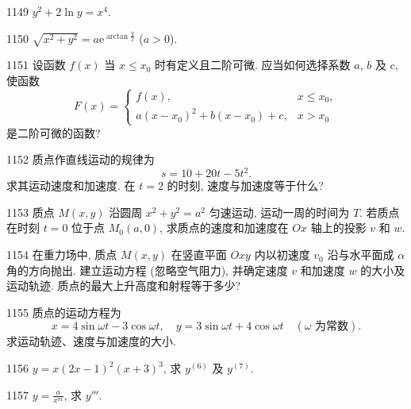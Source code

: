 \begin{prob}[S]{1149}
$y^2 + 2\ln y = x^4$.
\end{prob}

\begin{prob}[S]{1150}
$\sqrt{x^2 + y^2} = a\mathrm{e}^{\arctan\frac{y}{x}}$ ($a > 0$).
\end{prob}

\begin{prob}[M]{1151}
设函数 $f(x)$ 当 $x \leqslant x_0$ 时有定义且二阶可微. 应当如何选择系数 $a$, $b$ 及 $c$, 使函数
\[
F(x) = \begin{cases}
f(x), & x \leqslant x_0, \\
a(x - x_0)^2 + b(x - x_0) + c, & x > x_0
\end{cases}
\]
是二阶可微的函数?
\end{prob}

\begin{prob}[M]{1152}
质点作直线运动的规律为
\[
s = 10 + 20t - 5t^2.
\]
求其运动速度和加速度. 在 $t = 2$ 的时刻, 速度与加速度等于什么?
\end{prob}

\begin{prob}[M]{1153}
质点 $M(x, y)$ 沿圆周 $x^2 + y^2 = a^2$ 匀速运动, 运动一周的时间为 $T$. 若质点在时刻 $t = 0$ 位于点 $M_0(a, 0)$, 求质点的速度和加速度在 $Ox$ 轴上的投影 $v$ 和 $w$.
\end{prob}

\begin{prob}[L]{1154}
在重力场中, 质点 $M(x, y)$ 在竖直平面 $Oxy$ 内以初速度 $v_0$ 沿与水平面成 $\alpha$ 角的方向抛出. 建立运动方程 (忽略空气阻力), 并确定速度 $v$ 和加速度 $w$ 的大小及运动轨迹. 质点的最大上升高度和射程等于多少?
\end{prob}

\begin{prob}[M]{1155}
质点的运动方程为
\[
x = 4\sin\omega t - 3\cos\omega t, \quad y = 3\sin\omega t + 4\cos\omega t \quad (\omega \text{ 为常数}).
\]
求运动轨迹、速度与加速度的大小.
\end{prob}


\begin{prob}[S]{1156}
$y = x(2x - 1)^2(x + 3)^3$, 求 $y^{(6)}$ 及 $y^{(7)}$.
\end{prob}

\begin{prob}[S]{1157}
$y = \frac{a}{x^m}$, 求 $y'''$.
\end{prob}

